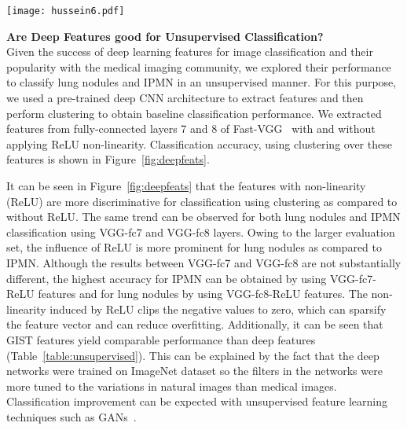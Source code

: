\documentclass[journal]{IEEEtran}
\begin{document}
\begin{figure*}[t]
\centering
\texttt{[image: hussein6.pdf]}
\caption{Influence of deep learning features obtained from different layers of a VGG network with and without ReLU non-linearities. The graph on the left shows accuracy, sensitivity and specificity for unsupervised lung nodule classification (clustering), whereas the right one shows the corresponding results for IPMN.}
\label{fig:deepfeats}
\end{figure*}

\noindent\textbf{Are Deep Features good for Unsupervised Classification?}\\
\noindent Given the success of deep learning features for image classification and their popularity with the medical imaging community, we explored their performance to classify lung nodules and IPMN in an unsupervised manner. For this purpose, we used a pre-trained deep CNN architecture to extract features and then perform clustering to obtain baseline classification performance. We extracted features from fully-connected layers 7 and 8 of Fast-VGG~\cite{VGG} with and without applying ReLU non-linearity. Classification accuracy, using clustering over these features is shown in Figure~\ref{fig:deepfeats}.

It can be seen in Figure~\ref{fig:deepfeats} that the features with non-linearity (ReLU) are more discriminative for classification using clustering as compared to without ReLU. The same trend can be observed for both lung nodules and IPMN classification using VGG-fc7 and VGG-fc8 layers. Owing to the larger evaluation set, the influence of ReLU is more prominent for lung nodules as compared to IPMN. Although the results between VGG-fc7 and VGG-fc8 are not substantially different, the highest accuracy for IPMN can be obtained by using VGG-fc7-ReLU features and for lung nodules by using VGG-fc8-ReLU features. The non-linearity induced by ReLU clips the negative values to zero, which can sparsify the feature vector and can reduce overfitting. Additionally, it can be seen that GIST features yield comparable performance than deep features (Table~\ref{table:unsupervised}). This can be explained by the fact that the deep networks were trained on ImageNet dataset so the filters in the networks were more tuned to the variations in natural images than medical images. Classification improvement can be expected with unsupervised feature learning techniques such as GANs~\cite{radford2015unsupervised}.\\
\end{document}

